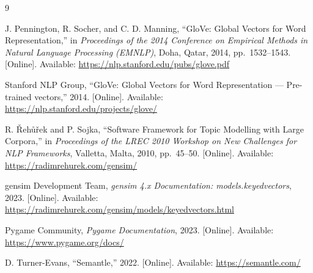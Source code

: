 \documentclass[11pt]{article}
\begin{document}
\begin{thebibliography}{9}

    J. Pennington, R. Socher, and C. D. Manning,
    ``GloVe: Global Vectors for Word Representation,''
    in \textit{Proceedings of the 2014 Conference on Empirical Methods in
    Natural Language Processing (EMNLP)}, Doha, Qatar, 2014, pp.\ 1532--1543.
    [Online]. Available: \url{https://nlp.stanford.edu/pubs/glove.pdf}

    Stanford NLP Group,
    ``GloVe: Global Vectors for Word Representation --- Pre-trained vectors,''
    2014.
    [Online]. Available: \url{https://nlp.stanford.edu/projects/glove/}

    R. \v{R}eh\r{u}\v{r}ek and P. Sojka,
    ``Software Framework for Topic Modelling with Large Corpora,''
    in \textit{Proceedings of the LREC 2010 Workshop on New Challenges for NLP
    Frameworks}, Valletta, Malta, 2010, pp.\ 45--50.
    [Online]. Available: \url{https://radimrehurek.com/gensim/}

    gensim Development Team,
    \textit{gensim 4.x Documentation: models.keyedvectors},
    2023.
    [Online]. Available:
    \url{https://radimrehurek.com/gensim/models/keyedvectors.html}

    Pygame Community,
    \textit{Pygame Documentation},
    2023.
    [Online]. Available: \url{https://www.pygame.org/docs/}

    D. Turner-Evans,
    ``Semantle,''
    2022.
    [Online]. Available: \url{https://semantle.com/}

\end{thebibliography}
\end{document}
